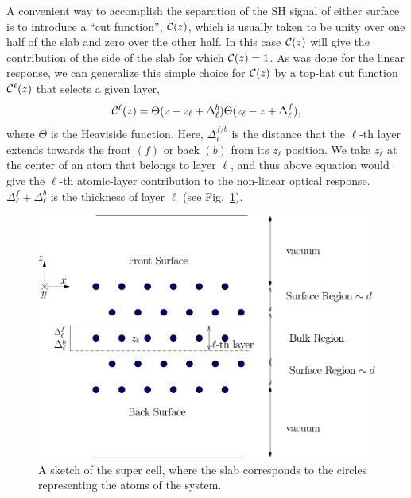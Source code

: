 \documentclass[floatfix,prb,aps,superscriptaddress,11pt,preprint,letterpaper]{revtex4}
\begin{document}
A convenient way to accomplish the separation of the SH signal of
either surface is to introduce a ``cut function'', ${\mathbf{\cal C}}(z)$, which is 
usually taken to be unity over one half of the slab and zero over 
the other half.\cite{reining_microscopic_1994}
 In this case ${\mathbf{\cal C}}(z)$ will give the contribution of the 
side of the slab for which ${\mathbf{\cal C}}(z)=1$. 
As was done for the linear response,\cite{mendozaPRB06}
we can generalize this 
simple choice for ${\mathbf{\cal C}}(z)$ by a top-hat cut function
${\mathbf{\cal C}}^\ell(z)$ that selects a given layer,
\begin{equation}
\label{sz}
{\mathbf{\cal C}}^\ell(z)=\Theta(z-z_\ell+\Delta_\ell^{b})  
            \Theta(z_\ell-z+\Delta_\ell^f),
\end{equation} 
where $\Theta$ is the Heaviside function. Here, $\Delta_\ell^{f/b}$
is the distance that the $\ell$-th layer extends towards the front
$(f)$ or back $(b)$ from its $z_\ell$ position. 
 We take $z_\ell$
 at the center of an atom that 
belongs to layer $\ell$, and thus above equation would give the $\ell$-th 
 atomic-layer 
contribution to the non-linear optical response.
$\Delta_\ell^f+\Delta_\ell^b$ is the thickness of layer $\ell$ 
(see Fig.~\ref{fslab}).
\begin{figure}[b]
\centering
\includegraphics[scale=.7]{images/slab}
\caption{A sketch of the super cell, where the slab corresponds to the
  circles representing the atoms of the system.\label{fslab}} 
\end{figure}
\end{document}
